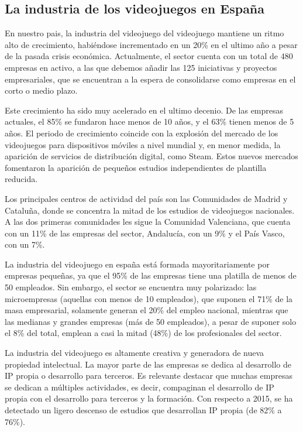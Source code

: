 \subsection{La industria de los videojuegos en España}
En nuestro pais, la industria del videojuego del videojuego mantiene un ritmo alto de crecimiento, habiéndose incrementado en un 20\% en el ultimo año a pesar de la pasada crisis económica. Actualmente, el sector cuenta con un total de  480 empresas en activo, a las que debemos añadir las 125 iniciativas y proyectos empresariales, que se encuentran a la espera de consolidarse como empresas en el corto o medio plazo.

Este crecimiento ha sido muy acelerado en el ultimo decenio. De las empresas actuales, el 85\% se fundaron hace menos de 10 años, y el 63\% tienen menos de 5 años. El periodo de crecimiento coincide con la explosión del mercado de los videojuegos para dispositivos móviles a nivel mundial y, en menor medida, la aparición de servicios de distribución digital, como Steam. Estos nuevos mercados fomentaron la aparición de pequeños estudios independientes de plantilla reducida.

Los principales centros de actividad del país son las Comunidades de Madrid y Cataluña, donde se concentra la mitad de los estudios de videojuegos nacionales. A las dos primeras comunidades les sigue la Comunidad Valenciana, que cuenta con un 11\% de las empresas del sector, Andalucía, con un 9\% y el País Vasco, con un 7\%.

La industria del videojuego en españa está formada mayoritariamente por empresas pequeñas, ya que el 95\% de las empresas tiene una platilla de menos de 50 empleados. Sin embargo, el sector se encuentra muy polarizado: las microempresas (aquellas con menos de 10 empleados), que suponen el 71\% de la masa empresarial, solamente generan el 20\% del empleo nacional, mientras que las medianas y grandes empresas (más de 50 empleados), a pesar de suponer solo el 8\% del total, emplean a casi la mitad (48\%) de los profesionales del sector.

La industria del videojuego es altamente creativa y generadora de nueva propiedad intelectual. La mayor parte de las empresas se dedica al desarrollo de IP propia o desarrollo para terceros. Es relevante destacar que muchas empresas se dedican a múltiples actividades, es decir, compaginan el desarrollo de IP propia con el desarrollo para terceros y la formación. Con respecto a 2015, se ha detectado un ligero descenso de estudios que desarrollan IP propia (de 82\% a 76\%).

